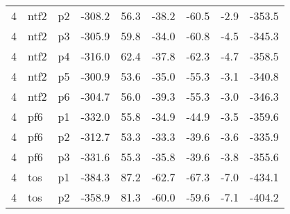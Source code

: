 \documentclass[a4paper]{article}
\begin{document}
\begin{table}[ht]
\begin{tabular}{rllrrrrrr}
   4 & ntf2 & p2 & -308.2 & 56.3 & -38.2 & -60.5 & -2.9 & -353.5 \\ 
   4 & ntf2 & p3 & -305.9 & 59.8 & -34.0 & -60.8 & -4.5 & -345.3 \\ 
   4 & ntf2 & p4 & -316.0 & 62.4 & -37.8 & -62.3 & -4.7 & -358.5 \\ 
   4 & ntf2 & p5 & -300.9 & 53.6 & -35.0 & -55.3 & -3.1 & -340.8 \\ 
   4 & ntf2 & p6 & -304.7 & 56.0 & -39.3 & -55.3 & -3.0 & -346.3 \\ 
   4 & pf6 & p1 & -332.0 & 55.8 & -34.9 & -44.9 & -3.5 & -359.6 \\ 
   4 & pf6 & p2 & -312.7 & 53.3 & -33.3 & -39.6 & -3.6 & -335.9 \\ 
   4 & pf6 & p3 & -331.6 & 55.3 & -35.8 & -39.6 & -3.8 & -355.6 \\ 
   4 & tos & p1 & -384.3 & 87.2 & -62.7 & -67.3 & -7.0 & -434.1 \\ 
   4 & tos & p2 & -358.9 & 81.3 & -60.0 & -59.6 & -7.1 & -404.2 \\ 
   \hline
\end{tabular}
\end{table}
\end{document}
